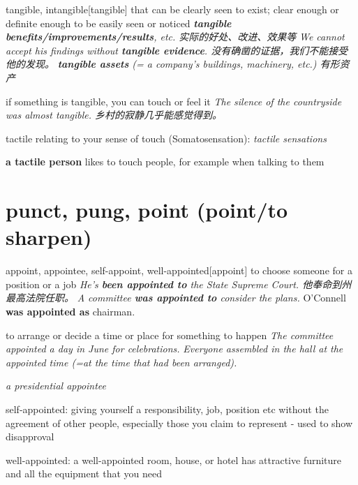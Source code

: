 \begin{DefWord}{tangible, intangible}[tangible]
    that can be clearly seen to exist; clear enough or definite enough to be easily seen or noticed
    \textit{\textbf{tangible benefits/improvements/results}, etc. 实际的好处、改进、效果等 }
    \textit{We cannot accept his findings without \textbf{tangible evidence}. 没有确凿的证据，我们不能接受他的发现。}
    \textit{\textbf{tangible assets} (= a company's buildings, machinery, etc.) 有形资产}

    if something is tangible, you can touch or feel it
    \textit{The silence of the countryside was almost tangible. 乡村的寂静几乎能感觉得到。}
\end{DefWord}



\begin{DefWord}{tactile}
    relating to your sense of touch (Somatosensation):
    \textit{tactile sensations}
    
    \textbf{a tactile person} likes to touch people, for example when talking to them

\end{DefWord}


\section{punct, pung, point (point/to sharpen)}

\begin{DefWord}{appoint, appointee, self-appoint, well-appointed}[appoint]
    to choose someone for a position or a job
    \textit{He's \textbf{been appointed to }the State Supreme Court. 他奉命到州最高法院任职。}
    \textit{A committee \textbf{was appointed to} consider the plans.}
    O'Connell \textbf{was appointed as} chairman.

    to arrange or decide a time or place for something to happen
    \textit{The committee appointed a day in June for celebrations.}
    \textit{Everyone assembled in the hall at the appointed time (=at the time that had been arranged).}

    \textit{a presidential appointee}

    self-appointed: giving yourself a responsibility, job, position etc without the agreement of other people, especially those you claim to represent - used to show disapproval

    well-appointed: a well-appointed room, house, or hotel has attractive furniture and all the equipment that you need
\end{DefWord}

